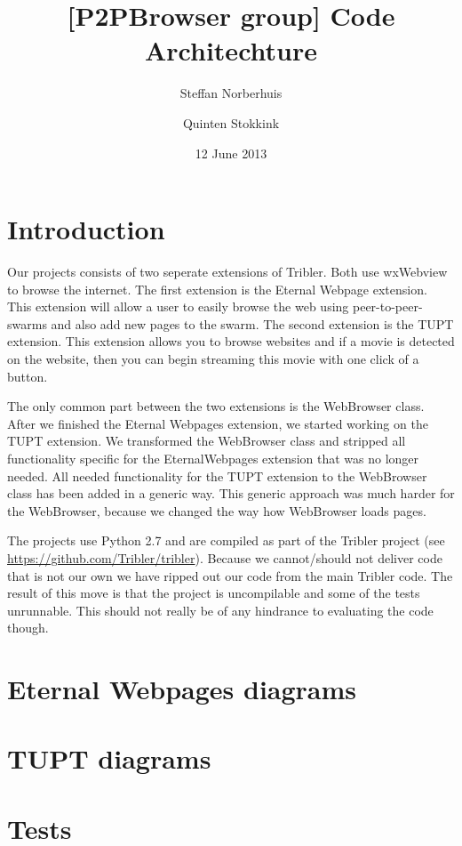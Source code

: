 \documentclass[a4paper,11pt]{article}
\title{[P2PBrowser group] Code Architechture}
\author{Steffan Norberhuis \and Quinten Stokkink}
\date{12 June 2013}
\begin{document}
   \maketitle

\section{Introduction}
Our projects consists of two seperate extensions of Tribler. Both use wxWebview to browse the internet.
The first extension is the Eternal Webpage extension.
This extension will allow a user to easily browse the web using peer-to-peer-swarms and also add new pages to the swarm.
The second extension is the TUPT extension.
This extension allows you to browse websites and if a movie is detected on the website,
then you can begin streaming this movie with one click of a button.

The only common part between the two extensions is the WebBrowser class.
After we finished the Eternal Webpages extension, we started working on the TUPT extension.
We transformed the WebBrowser class and stripped all functionality specific for the EternalWebpages extension that was no longer needed.
All needed functionality for the TUPT extension to the WebBrowser class has been added in a generic way.
This generic approach was much harder for the WebBrowser, because we changed the way how WebBrowser loads pages.

The projects use Python 2.7 and are compiled as part of the Tribler project (see \url{https://github.com/Tribler/tribler}).
Because we cannot/should not deliver code that is not our own we have ripped out our code
from the main Tribler code. The result of this move is that the project is uncompilable and 
some of the tests unrunnable. This should not really be of any hindrance to evaluating the code though.

\section{Eternal Webpages diagrams}


\section{TUPT diagrams}


\section{Tests}

\end{document}
